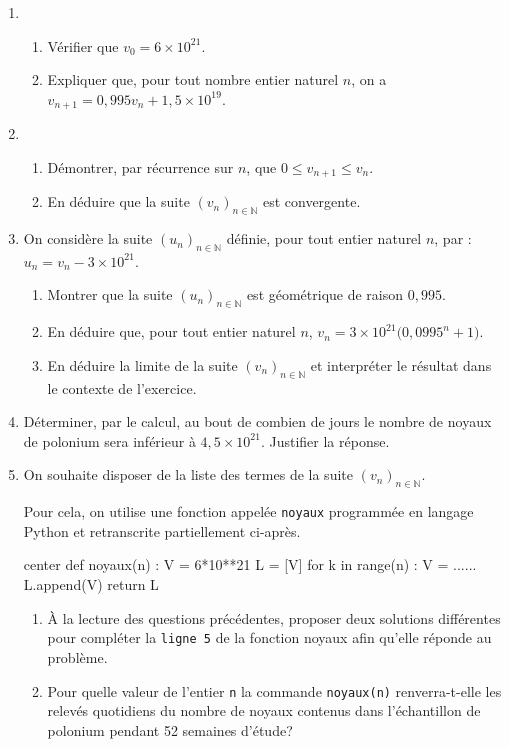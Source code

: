 \begin{enumerate}
	\item 
	\begin{enumerate}
		\item Vérifier que $v_0 = 6 \times 10^{21}$.
		\item Expliquer que, pour tout nombre entier naturel $n$, on a $v_{n+1} = 0,995v_n + 1,5 \times 10^{19}$.
	\end{enumerate}
	\item 
	\begin{enumerate}
		\item Démontrer, par récurrence sur $n$, que $0 \leqslant v_{n+1} \leqslant v_n$.
		\item En déduire que la suite $\left(v_n\right)_{n \in \mathbb{N}}$ est convergente.
	\end{enumerate}
	\item On considère la suite $\left(u_n\right)_{n \in \mathbb{N}}$ définie, pour tout entier naturel $n$, par : $u_n = v_n - 3 \times 10^{21}$.
	\begin{enumerate}
		\item Montrer que la suite $\left(u_n\right)_{n \in \mathbb{N}}$ est géométrique de raison $0,995$.
		\item En déduire que, pour tout entier naturel $n$, $v_n = 3 \times 10^{21} \big(0,0995^n+1\big)$.
		\item En déduire la limite de la suite $\left(v_n\right)_{n \in \mathbb{N}}$ et interpréter le résultat dans le contexte de l'exercice.
	\end{enumerate}
	\item Déterminer, par le calcul, au bout de combien de jours le nombre de noyaux de polonium sera
	inférieur à $4,5 \times 10^{21}$. Justifier la réponse.
	\item On souhaite disposer de la liste des termes de la suite $\left(v_n\right)_{n \in \mathbb{N}}$.
	
	Pour cela, on utilise une fonction appelée \texttt{noyaux} programmée en langage \textsf{Python} et retranscrite partiellement ci-après.

\begin{CodePythonLstAlt}[Largeur=10cm]{center}
def noyaux(n) :
	V = 6*10**21
	L = [V]
	for k in range(n) :
		V = ......
		L.append(V)
	return L
\end{CodePythonLstAlt}
	\begin{enumerate}
		\item À la lecture des questions précédentes, proposer deux solutions différentes pour compléter
		la \texttt{ligne 5} de la fonction noyaux afin qu'elle réponde au problème.
		\item Pour quelle valeur de l'entier \texttt{n} la commande \texttt{noyaux(n)} renverra-t-elle les relevés quotidiens du nombre de noyaux contenus dans l'échantillon de polonium pendant 52 semaines d'étude? 
	\end{enumerate}
\end{enumerate}
